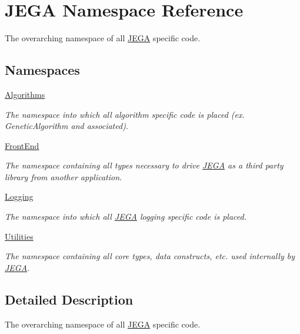 \hypertarget{namespaceJEGA}{}\section{J\+E\+GA Namespace Reference}
\label{namespaceJEGA}


The overarching namespace of all \hyperlink{namespaceJEGA}{J\+E\+GA} specific code.  


\subsection*{Namespaces}
\begin{DoxyCompactItemize}
\item 
 \hyperlink{namespaceJEGA_1_1Algorithms}{Algorithms}
\begin{DoxyCompactList}\small\item\em The namespace into which all algorithm specific code is placed (ex. Genetic\+Algorithm and associated). \end{DoxyCompactList}\item 
 \hyperlink{namespaceJEGA_1_1FrontEnd}{Front\+End}
\begin{DoxyCompactList}\small\item\em The namespace containing all types necessary to drive \hyperlink{namespaceJEGA}{J\+E\+GA} as a third party library from another application. \end{DoxyCompactList}\item 
 \hyperlink{namespaceJEGA_1_1Logging}{Logging}
\begin{DoxyCompactList}\small\item\em The namespace into which all \hyperlink{namespaceJEGA}{J\+E\+GA} logging specific code is placed. \end{DoxyCompactList}\item 
 \hyperlink{namespaceJEGA_1_1Utilities}{Utilities}
\begin{DoxyCompactList}\small\item\em The namespace containing all core types, data constructs, etc. used internally by \hyperlink{namespaceJEGA}{J\+E\+GA}. \end{DoxyCompactList}\end{DoxyCompactItemize}


\subsection{Detailed Description}
The overarching namespace of all \hyperlink{namespaceJEGA}{J\+E\+GA} specific code. 